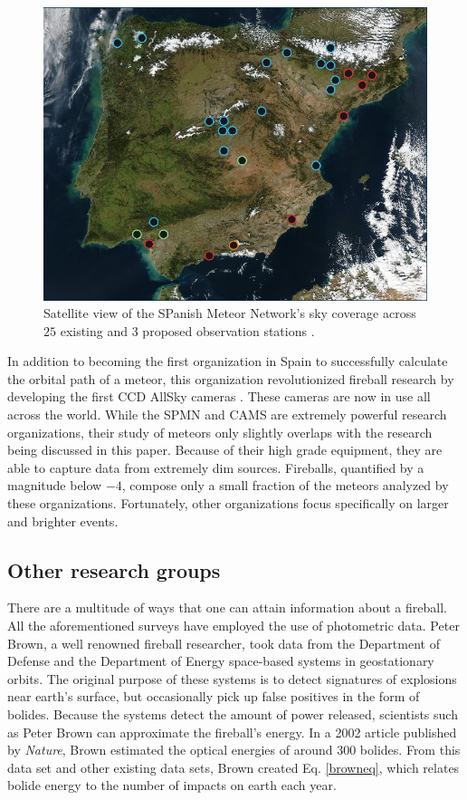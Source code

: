 \begin{figure}[ht!]
  \centering
  \includegraphics[scale=0.3]{images/satalite_of_love.png}
  \caption{Satellite view of the SPanish Meteor Network's sky coverage across $25$ existing and $3$ proposed observation stations  \cite{Spanish}.}
  \label{SPan}
\end{figure}

In addition to becoming the first organization in Spain to successfully calculate the orbital path of a meteor, this organization revolutionized fireball research by developing the first CCD AllSky cameras \cite{Spanish}.
These cameras are now in use all across the world.
While the SPMN and CAMS are extremely powerful research organizations, their study of meteors only slightly overlaps with the research being discussed in this paper.
Because of their high grade equipment, they are able to capture data from extremely dim sources.
Fireballs, quantified by a magnitude below $-4$, compose only a small fraction of the meteors analyzed by these organizations.
Fortunately, other organizations focus specifically on larger and brighter events.

\subsection{Other research groups}

There are a multitude of ways that one can attain information about a fireball.  
All the aforementioned surveys have employed the use of photometric data.
Peter Brown, a well renowned fireball researcher, took data from the Department of Defense and the Department of Energy space-based systems in geostationary orbits.
The original purpose of these systems is to detect signatures of explosions near earth's surface, but occasionally pick up false positives in the form of bolides.  
Because the systems detect the amount of power released, scientists such as Peter Brown can approximate the fireball's energy.
In a 2002 article published by \textit{Nature}, Brown estimated the optical energies of around 300 bolides.
From this data set and other existing data sets, Brown created Eq. \ref{browneq}, which relates bolide energy to the number of impacts on earth each year. 

